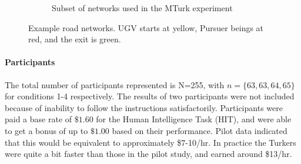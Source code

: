 \begin{figure}[tbp]
\begin{subfigure}[b]{0.80\linewidth}
            \caption{Subset of networks used in the MTurk experiment}
            \label{fig:exp_set}
        \end{subfigure} 
        \caption{Example road networks. UGV starts at yellow, Pursuer beings at red, and the exit is green. }
        \label{fig:experiment_data}
        \vspace{-0.2cm}
    \end{figure}

    \noindent \paragraph{Participants}
    The total number of participants represented is N=255, with $n=\{63,63,64,65\}$ for conditions 1-4 respectively. The results of two participants were not included because of inability to follow the instructions satisfactorily. Participants were paid a base rate of $\$1.60$ for the Human Intelligence Task (HIT), and were able to get a bonus of up to $\$1.00$ based on their performance. Pilot data indicated that this would be equivalent to approximately \$7-10/hr. In practice the Turkers were quite a bit faster than those in the pilot study, and earned around \$13/hr.
